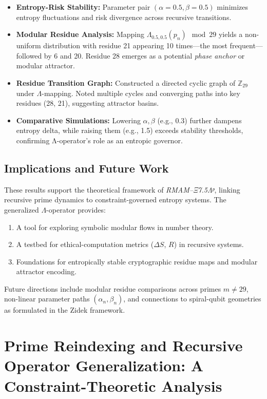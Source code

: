 \documentclass[12]{amsart}
\theoremstyle{plain}
\begin{document}
\begin{itemize}
    \item \textbf{Entropy-Risk Stability:} Parameter pair \((\alpha = 0.5, \beta = 0.5)\) minimizes entropy fluctuations and risk divergence across recursive transitions.
    \item \textbf{Modular Residue Analysis:} Mapping \(\Lambda_{0.5,0.5}(p_n) \mod 29\) yields a non-uniform distribution with residue 21 appearing 10 times—the most frequent—followed by 6 and 20. Residue 28 emerges as a potential \emph{phase anchor} or modular attractor.
    \item \textbf{Residue Transition Graph:} Constructed a directed cyclic graph of \(\mathbb{Z}_{29}\) under \(\Lambda\)-mapping. Noted multiple cycles and converging paths into key residues (28, 21), suggesting attractor basins.
    \item \textbf{Comparative Simulations:} Lowering \(\alpha, \beta\) (e.g., 0.3) further dampens entropy delta, while raising them (e.g., 1.5) exceeds stability thresholds, confirming Λ-operator's role as an entropic governor.
\end{itemize}

\subsection{Implications and Future Work}

These results support the theoretical framework of \textit{RMAM–Ξ7.5Λᵖ}, linking recursive prime dynamics to constraint-governed entropy systems. The generalized \(\Lambda\)-operator provides:

\begin{enumerate}
    \item A tool for exploring symbolic modular flows in number theory.
    \item A testbed for ethical-computation metrics (\(\Delta S\), \(R\)) in recursive systems.
    \item Foundations for entropically stable cryptographic residue maps and modular attractor encoding.
\end{enumerate}

Future directions include modular residue comparisons across primes \(m \neq 29\), non-linear parameter paths \((\alpha_n, \beta_n)\), and connections to spiral-qubit geometries as formulated in the Zidek framework.

\section{Prime Reindexing and Recursive Operator Generalization: A Constraint-Theoretic Analysis}
\end{document}
